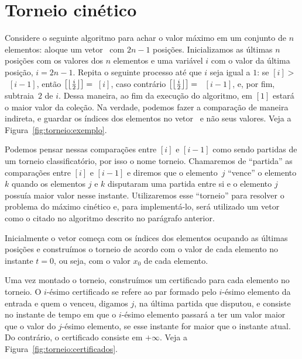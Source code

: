 
\newcommand{\thickness}{0.75mm}
\FloatBarrier


\section{Torneio cinético} \label{sec:torneio}

Considere o seguinte algoritmo para achar o valor máximo em um
conjunto de $n$ elementos: aloque um vetor \torneio~com $2n - 1$
posições.
Inicializamos as últimas $n$ posições com os valores dos $n$ elementos e uma variável $i$ com o
valor da última posição, $i = 2n - 1$.
Repita o seguinte processo até que $i$ seja igual a $1$: se \torneio$[i] > $~\torneio$[i - 1]$,
então \torneio$\left[\left\lfloor \frac{i}{2} \right\rfloor\right] =$~\torneio$[i]$, caso contrário
\torneio$\left[\left\lfloor \frac{i}{2} \right\rfloor\right] =$~ \torneio$[i - 1]$, e, por fim, subtraia~$2$ de $i$.
Dessa maneira, ao fim da execução do algoritmo, em \torneio$[1]$ estará o maior valor da coleção.
Na verdade, podemos fazer a comparação de maneira indireta, e guardar os índices dos elementos no
vetor \torneio~e não seus valores.
Veja a Figura~\ref{fig:torneio:exemplo}.



Podemos pensar nessas comparações entre \torneio$[i]$ e \torneio$[i-1]$ como sendo partidas de um
torneio classificatório, por isso o nome torneio.
Chamaremos de ``partida'' as comparações entre \torneio$[i]$ e \torneio$[i-1]$ e diremos que o
elemento~$j$ ``vence'' o elemento $k$ quando os elementos $j$ e $k$ disputaram uma partida entre
si e o elemento $j$ possuía maior valor nesse instante.
Utilizaremos esse ``torneio'' para resolver o problema do máximo cinético e, para implementá-lo,
será utilizado um vetor como o citado no algoritmo descrito no parágrafo anterior.

Inicialmente o vetor começa com os índices dos elementos ocupando as últimas posições e
construímos o torneio de acordo com o valor de cada elemento no instante $t = 0$, ou seja, com o
valor $x_0$ de cada elemento.

Uma vez montado o torneio, construímos um certificado para cada elemento no torneio.
O $i$-ésimo certificado se refere ao par formado pelo $i$-ésimo elemento da entrada e quem o
venceu, digamos $j$, na última partida que disputou, e consiste no instante de tempo em que o
$i$-ésimo elemento passará a ter um valor maior que o valor do $j$-ésimo elemento, se esse instante
for maior que o instante atual.
Do contrário, o certificado consiste em $+\infty$.
Veja a Figura~\ref{fig:torneio:certificados}.

